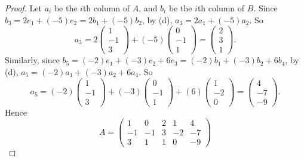 \begin{proof}
Let \(a_i\) be the \(i\)th column of \(A\), and \(b_i\) be the \(i\)th column of \(B\).
Since \(b_3 = 2 e_1 + (-5) e_2 = 2 b_1 + (-5) b_2\), by (d), \(a_3 = 2 a_1 + (-5) a_2\).
So
\[
    a_3 = 2 \begin{pmatrix} 1 \\ -1 \\ 3 \end{pmatrix}
        + (-5) \begin{pmatrix} 0 \\ -1 \\ 1 \end{pmatrix}
        = \begin{pmatrix} 2 \\ 3 \\ 1 \end{pmatrix}.
\]
Similarly, since \(b_5 = (-2) e_1 + (-3) e_2 + 6 e_3 = (-2) b_1 + (-3) b_2 + 6 b_4\), by (d), \(a_5 = (-2) a_1 + (-3) a_2 + 6 a_4\).
So
\[
    a_5 = (-2) \begin{pmatrix} 1 \\ -1 \\ 3 \end{pmatrix}
        + (-3) \begin{pmatrix} 0 \\ -1 \\ 1 \end{pmatrix}
        + (6) \begin{pmatrix} 1 \\ -2 \\ 0 \end{pmatrix}
        = \begin{pmatrix} 4 \\ -7 \\ -9 \end{pmatrix}.
\]
Hence
\[
    A = \left(\begin{array}{ccccc}
        1 & 0 & 2 & 1 & 4 \\
        -1 & -1 & 3 & -2 & -7 \\
        3 & 1 & 1 & 0 & -9
    \end{array}\right)
\]
\end{proof}

